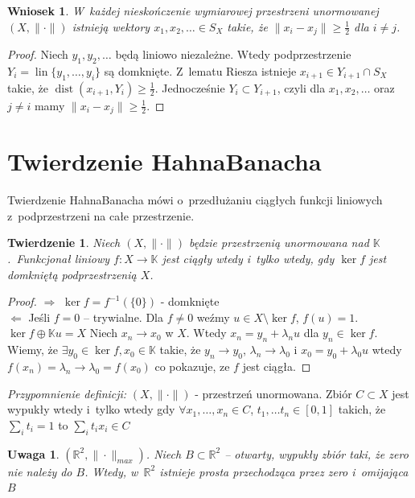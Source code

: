 \documentclass[11pt]{mwrep}
\renewcommand{\[}{\begin{equation}}
\renewcommand{\]}{\end{equation}}
\newcommand{\R}{{\ensuremath{\mathbb R}}}
\newcommand{\K}{\ensuremath{\mathbb{K}}}
\newcommand{\lin}{\operatorname{lin}}
\newcommand{\dist}{\operatorname{dist}}
\newtheorem{twr}[subsection]{Twierdzenie}%
\newtheorem{wn}[subsection]{Wniosek}
\newtheorem{uw}[subsection]{Uwaga}
\begin{document}
\begin{wn}
  W~każdej nieskończenie wymiarowej przestrzeni unormowanej $(X,\|\cdot\|)$ istnieją wektory $x_1, x_2, \ldots  \in S_X$ 
  takie, że $\|x_i-x_j\|\ge \frac{1}{2}$ dla $i\not= j$.
\end{wn}
\begin{proof}
	Niech $y_1, y_2, \ldots$ będą  liniowo niezależne. Wtedy podprzestrzenie $Y_i = \lin\{y_1,\ldots, y_i \}$ są domknięte.
	Z~lematu Riesza istnieje $x_{i+1}  \in Y_{i+1} \cap S_X$ takie, że $\dist (x_{i+1}, Y_i) \ge \frac{1}{2}$. Jednocześnie $Y_i \subset Y_{i+1}$,
	czyli dla $x_1, x_2, \ldots $ oraz $j\neq i$ mamy $\|x_i-x_j\|\ge \frac{1}{2}$.
\end{proof}
\section{Twierdzenie Hahna\dywiz Banacha} 
Twierdzenie Hahna\dywiz Banacha mówi o~przedłużaniu ciągłych funkcji liniowych z~podprzestrzeni na całe przestrzenie.
\begin{twr}
	Niech $(X,\|\cdot\|)$ będzie przestrzenią unormowana nad \K.~Funkcjonał liniowy $f:X\to\K$ jest ciągły wtedy i~tylko wtedy, gdy
	$\ker f$ jest domkniętą podprzestrzenią $X$.
\end{twr}
\begin{proof}
	$\Rightarrow$ $\ker f = f^{-1}(\{0\})$ - domknięte\\
	$\Leftarrow$ Jeśli $f=0$ -- trywialne. Dla $f \not =0$ weźmy $u\in X \setminus \ker f$, $f(u)=1$. $\ker f \oplus \K u = X$ 
	Niech $x_n \to x_0$ w $X$. Wtedy $x_n =y_n + \lambda_n u$ dla $y_n \in \ker f$.
	Wiemy, że $\exists y_0 \in \ker f, x_0 \in \K$ takie, że $y_n \to y_0$, $\lambda_n \to \lambda_0$ i
	$x_0= y_0 +\lambda_0 u$ wtedy  $f(x_n) = \lambda_n\to \lambda_0 = f(x_0)$ co pokazuje, ze $f$ jest ciągła.
\end{proof}
\textit{Przypomnienie definicji:}
$(X,\|\cdot\|)$ - przestrzeń unormowana. Zbiór  $C\subset X$ jest wypukły  wtedy i~tylko wtedy gdy 
$\forall x_1,\ldots, x_n \in C$, $t_1, \ldots t_n \in [0,1]$ takich, że $\sum_i t_i = 1$ to $\sum_i t_i x_i \in C$
\begin{uw}
  \label{uw1_r}
	$(\R^2,\|\cdot\|_{max})$. Niech $B\subset \R^2$ -- otwarty, wypukły zbiór taki, że zero nie należy do $B$.
	Wtedy, w~$\R^2$ istnieje prosta przechodząca przez zero i~omijająca $B$
\end{uw}
\end{document}
